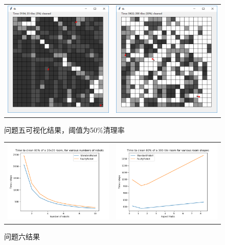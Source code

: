 \documentclass[logo,reportComp]{thesis}
\begin{document}
\begin{figure}[H]
\centering
\begin{tabular}{cc}
\includegraphics[width=0.4\linewidth]{fig/problem5-1.png}&
\includegraphics[width=0.4\linewidth]{fig/problem5-2.png}
\end{tabular}
\caption{问题五可视化结果，阈值为50\%清理率}
\label{fig:5v}
\end{figure}

\begin{figure}[H]
\centering
\begin{tabular}{cc}
\includegraphics[width=0.5\linewidth]{fig/problem6-1.png}&
\includegraphics[width=0.5\linewidth]{fig/problem6-2.png}
\end{tabular}
\caption{问题六结果}
\label{fig:6}
\end{figure}
\end{document}
